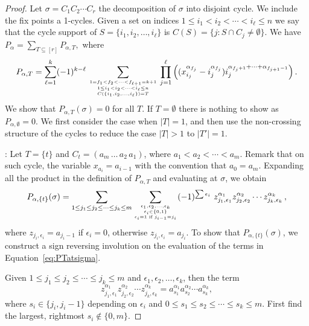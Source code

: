 \documentclass[11pt,oneside]{amsart}
\theoremstyle{definition}
\numberwithin{equation}{section}
\begin{document}
\begin{proof}
 Let $\sigma=C_1C_2\cdots C_r$  the decomposition of $\sigma$ into disjoint cycle. We include the fix points a 1-cycles.
 Given a set on indices $1\le i_1<i_2<\cdots < i_\ell\le n$ we say that the cycle support of $S=\{ i_1,i_2,\ldots , i_\ell\}$
 is $C(S)=\{j : S\cap C_j \not= \emptyset \}$. We have
 	$\displaystyle P_\alpha=\sum_{T\subseteq [r]} P_{\alpha,T},$
where 
\begin{equation}\label{eq:PT}
P_{\alpha,T}=
	\sum_{\ell=1}^k (-1)^{k-\ell} \sum_{{1=f_1<f_2<\cdots <f_{\ell+1}=k+1  \atop 1\le i_1<i_2<\cdots < i_\ell\le n}\atop C(\{ i_1,i_2,\ldots , i_\ell\})=T} \prod_{j=1}^\ell 
	      \Big( (x_{i_j}^{\alpha_{f_j}}- i_j^{\alpha_{f_j }})  i_j^{\alpha_{f_j +1}+\cdots+\alpha_{f_{j +1}-1}} \Big)\,.
\end{equation}
We show that $P_{\alpha,T}(\sigma)=0$ for all $T$. If $T=\emptyset$ there is nothing to show as $P_{\alpha,\emptyset}=0$. 
We first consider the case when $|T|=1$, and then use the non-crossing structure of the cycles to reduce the case $|T|>1$
to $|T'|=1$.

\medskip
{}: Let $T=\{t\}$ and $C_t=(a_m\,\ldots\,a_2\,a_1)$, where $a_1<a_2<\cdots<a_m$. Remark that on such cycle, the variable $x_{a_i}=a_{i-1}$ with the convention that $a_0=a_m$.
Expanding all the product in the definition of $P_{\alpha,T}$ and evaluating at $\sigma$, we obtain
\begin{equation}\label{eq:PTatsigma}
	P_{\alpha,\{t\}}(\sigma)=
	\sum_{{1\le j_1\le j_2\le\cdots\le j_k\le m}} \sum_{{\epsilon_1,\epsilon_2,\ldots,\epsilon_k \atop \epsilon_i\in \{0,1\}}\atop \epsilon_i=1 \text{ if } j_{i-1}=j_i} (-1)^{\sum \epsilon_i}\ 
	   z_{j_1,\epsilon_1}^{\alpha_1}z_{j_2,\epsilon_2}^{\alpha_2} \cdots z_{j_k,\epsilon_k}^{\alpha_k}\,,
\end{equation}
where $z_{j_i,\epsilon_i}=a_{j_i-1}$ if $\epsilon_i=0$, otherwise $z_{j_i,\epsilon_i}=a_{j_i}$. To show that $P_{\alpha,\{t\}}(\sigma)$, we construct a sign reversing involution 
on the evaluation of the terms in Equation~\eqref{eq:PTatsigma}.

Given $1\le j_1\le j_2\le\cdots\le j_k\le m$ and $\epsilon_1,\epsilon_2,\ldots,\epsilon_k$, then the term 
$$z_{j_1,\epsilon_1}^{\alpha_1}z_{j_2,\epsilon_2}^{\alpha_2} \cdots z_{j_k,\epsilon_k}^{\alpha_k}=a_{s_1}^{\alpha_1}a_{s_2}^{\alpha_2}\cdots a_{s_k}^{\alpha_k},$$
where $s_i\in\{j_i,j_i-1\}$ depending on $\epsilon_i$ and  $0\le s_1\le s_2\le \cdots\le s_k\le m$. First find the largest, rightmost $s_i\not\in\{0,m\}$. 


\end{proof}
\end{document}
